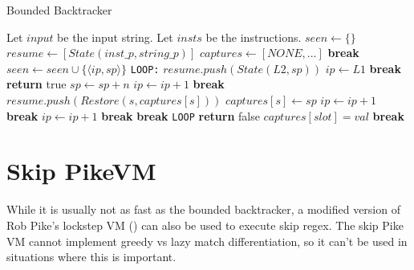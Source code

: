 \begin{algorithm}
\caption{Bounded Backtracker}
\label{algo:loopboundedback}

\begin{algorithmic}
\State Let $input$ be the input string.
\State Let $insts$ be the instructions.
  \State $seen \gets \{\}$
  \State $resume \gets [State(inst\_p, string\_p)]$
  \State $captures \gets [NONE, ...]$
          \State \textbf{break}
        \EndIf
        \State $seen \gets seen \cup \{\langle ip, sp \rangle\}$
        \State \verb'LOOP:'
              \State $resume.push(State(L2, sp))$
              \State $ip \gets L1$
              \State \textbf{break}
            \EndCase
              \State \textbf{return} true
            \EndCase
              \State $sp \gets sp + n$
              \State $ip \gets ip + 1$
              \State \textbf{break}
            \EndCase
              \State $resume.push(Restore(s, captures[s]))$
              \State $captures[s] \gets sp$
              \State $ip \gets ip + 1$
              \State \textbf{break}
            \EndCase
                \State $ip \gets ip + 1$
                \State \textbf{break}
              \Else
                \State \textbf{break} \verb'LOOP'
              \EndIf
            \EndCase
          \EndSwitch
        \EndWhile
        \State \textbf{return} false
      \EndCase
        \State $captures[slot] = val$
        \State \textbf{break}
      \EndCase
    \EndSwitch
  \EndWhile
\EndProcedure
\end{algorithmic}
\end{algorithm}

\section{Skip PikeVM}

While it is usually not as fast as the bounded backtracker,
a modified version of Rob Pike's lockstep VM (\cite{Pike1987})
can also be used to execute skip regex. The skip Pike VM cannot
implement greedy vs lazy match differentiation, so it can't be
used in situations where this is important.

